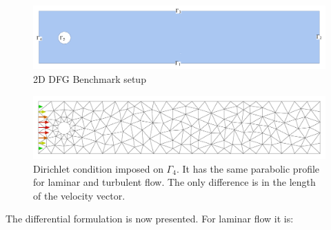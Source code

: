 \begin{figure}[H]
  \centering
  \includegraphics[scale=0.39]{Figures/02_model_problem/2D_DFG_Benchmark.pdf}
  \caption{2D DFG Benchmark setup}
  \label{fig:2D_DFG_Benchmark}
\end{figure}

\begin{figure}[H]
  \centering
  \includegraphics[scale=0.36]{Figures/02_model_problem/dirichlet_conditions.pdf}
  \caption{Dirichlet condition imposed on $\Gamma_4$. It has the same parabolic profile for laminar and turbulent flow. The only difference is in the length of the velocity vector.}
  \label{fig:2D_DFG_Benchmark_BC}
\end{figure}


The differential formulation is now presented. For laminar flow it is:

